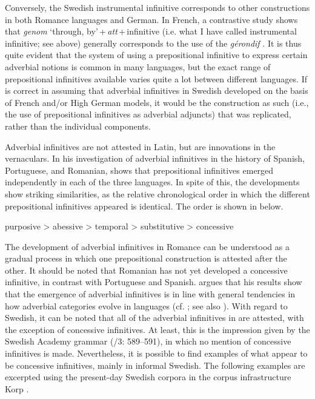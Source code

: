 \documentclass[output=paper]{langscibook}
\begin{document}
Conversely, the Swedish instrumental infinitive corresponds to other constructions in both Romance languages and German. In French, a contrastive study shows that \textit{genom} ‘through, by’\,+\,\textit{att}\,+\,infinitive (i.e. what I have called instrumental infinitive; see  above) generally corresponds to the use of the \textit{gérondif} \citep[128]{Hellqvist2015}. It is thus quite evident that the system of using a prepositional infinitive to express certain adverbial notions is common in many languages, but the exact range of prepositional infinitives available varies quite a lot between different languages. If \citet{Holm1967} is correct in assuming that adverbial infinitives in Swedish developed on the basis of French and/or High German models, it would be the construction as such (i.e., the use of prepositional infinitives as adverbial adjuncts) that was replicated, rather than the individual components. 



Adverbial infinitives are not attested in Latin, but are innovations in the vernaculars. In his investigation of adverbial infinitives in the history of Spanish, Portuguese, and Romanian, \citet{Schulte2007Prepositional,Schulte2007What} shows that prepositional infinitives emerged independently in each of the three languages. In spite of this, the developments show striking similarities, as the relative chronological order in which the different prepositional infinitives appeared is identical. The order is shown in  below. 


\ea \label{ex:kalm:6}
purposive > abessive > temporal > substitutive > concessive
\z

The development of adverbial infinitives in Romance can be understood as a gradual process in which one prepositional construction is attested after the other. It should be noted that Romanian has not yet developed a concessive infinitive, in contrast with Portuguese and Spanish. \citet{Schulte2007Prepositional} argues that his results show that the emergence of adverbial infinitives is in line with general tendencies in how adverbial categories evolve in languages (cf. \citealt{Cristofaro2005}; see also ). With regard to Swedish, it can be noted that all of the adverbial infinitives in  are attested, with the exception of concessive infinitives. At least, this is the impression given by the Swedish Academy grammar (\citealt{TelemanEtAl1999}/3: 589–591), in which no mention of concessive infinitives is made. Nevertheless, it is possible to find examples of what appear to be concessive infinitives, mainly in informal Swedish. The following examples are excerpted using the present-day Swedish corpora in the corpus infrastructure Korp \citep{BorinEtAl2012}. 
\end{document}
